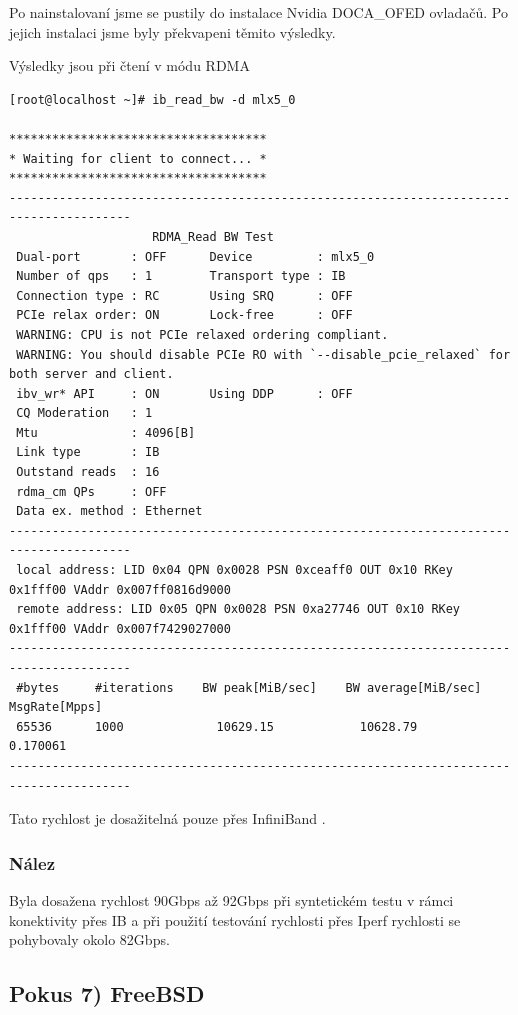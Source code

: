 Po nainstalovaní jsme se pustily do instalace Nvidia DOCA\_OFED ovladačů. Po jejich instalaci jsme byly překvapeni těmito výsledky.

Výsledky jsou při čtení v módu RDMA
\begin{footnotesize}
\begin{verbatim}
[root@localhost ~]# ib_read_bw -d mlx5_0

************************************
* Waiting for client to connect... *
************************************
---------------------------------------------------------------------------------------
                    RDMA_Read BW Test
 Dual-port       : OFF		Device         : mlx5_0
 Number of qps   : 1		Transport type : IB
 Connection type : RC		Using SRQ      : OFF
 PCIe relax order: ON		Lock-free      : OFF
 WARNING: CPU is not PCIe relaxed ordering compliant.
 WARNING: You should disable PCIe RO with `--disable_pcie_relaxed` for both server and client.
 ibv_wr* API     : ON		Using DDP      : OFF
 CQ Moderation   : 1
 Mtu             : 4096[B]
 Link type       : IB
 Outstand reads  : 16
 rdma_cm QPs	 : OFF
 Data ex. method : Ethernet
---------------------------------------------------------------------------------------
 local address: LID 0x04 QPN 0x0028 PSN 0xceaff0 OUT 0x10 RKey 0x1fff00 VAddr 0x007ff0816d9000
 remote address: LID 0x05 QPN 0x0028 PSN 0xa27746 OUT 0x10 RKey 0x1fff00 VAddr 0x007f7429027000
---------------------------------------------------------------------------------------
 #bytes     #iterations    BW peak[MiB/sec]    BW average[MiB/sec]   MsgRate[Mpps]
 65536      1000             10629.15            10628.79		     0.170061
---------------------------------------------------------------------------------------
\end{verbatim}

\end{footnotesize}

Tato rychlost je dosažitelná pouze přes InfiniBand \cite{InfiniBand}.

\subsubsection{Nález}
Byla dosažena rychlost 90Gbps až 92Gbps při syntetickém testu v rámci konektivity přes IB a při použití testování rychlosti přes Iperf rychlosti se pohybovaly okolo 82Gbps.

\newpage

\subsection{Pokus 7) FreeBSD}
\label{pokus7}
\nepovedeno

